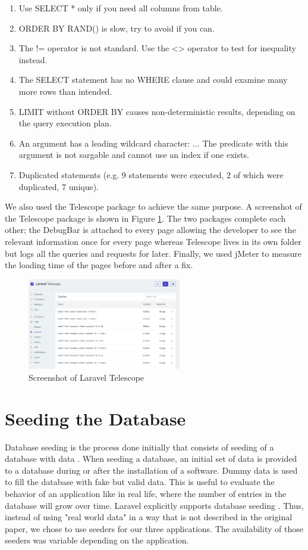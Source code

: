 \documentclass[sigconf]{acmart}
\begin{document}
\begin{enumerate}
\item Use SELECT * only if you need all columns from table.
\item ORDER BY RAND() is slow, try to avoid if you can.
\item The != operator is not standard. Use the <> operator to test for inequality instead.
\item The SELECT statement has no WHERE clause and could examine many more rows than intended.
\item LIMIT without ORDER BY causes non-deterministic results, depending on the query execution plan.
\item An argument has a leading wildcard character: ... The predicate with this argument is not sargable and cannot use an index if one exists.
\item Duplicated statements (e.g. 9 statements were executed, 2 of which were duplicated, 7 unique).
\end{enumerate}
\noindent We also used the Telescope package \cite{telescope} to achieve the same purpose. A screenshot of the Telescope package is shown in Figure \ref{telescope}. The two packages complete each other; the DebugBar is attached to every page allowing the developer to see the relevant information once for every page whereas Telescope lives in its own folder but logs all the queries and requests for later. Finally, we used jMeter \cite{jmeter} to measure the loading time of the pages before and after a fix.

\begin{figure}[ht!]
\includegraphics[width=0.6\textwidth]{telescope}
\caption{Screenshot of Laravel Telescope}
\label{telescope}
\end{figure}

\section{Seeding the Database}
Database seeding is the process done initially that consists of seeding of a database with data \cite{seeding}. When seeding a database, an initial set of data is provided to a database during or after the installation of a software. Dummy data is used to fill the database with fake but valid data. This is useful to evaluate the behavior of an application like in real life, where the number of entries in the database will grow over time. Laravel explicitly supports database seeding \cite{laravelseeding}. Thus, instead of using "real world data" in a way that is not described in the original paper, we chose to use seeders for our three applications. The availability of those seeders was variable depending on the application.
\end{document}
